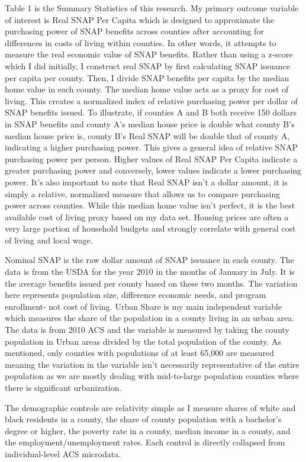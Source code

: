 \documentclass{article}
\begin{document}
Table 1 is the Summary Statistics of this research. My primary outcome variable of interest is Real SNAP Per Capita which is designed to approximate the purchasing power of SNAP benefits across counties after accounting for differences in costs of living within counties. In other words, it attempts to measure the real economic value of SNAP benefits. Rather than using a z-score which I did initially, I construct real SNAP by first calculating SNAP issuance per capita per county. Then, I divide SNAP benefits per capita by the median home value in each county. The median home value acts as a proxy for cost of living. This creates a normalized index of relative purchasing power per dollar of SNAP benefits issued. To illustrate, if counties A and B both receive 150 dollars in SNAP benefits and county A's median house price is double what county B's median house price is, county B's Real SNAP will be double that of county A, indicating a higher purchasing power. This gives a general idea of relative SNAP purchasing power per person. Higher values of Real SNAP Per Capita indicate a greater purchasing power and conversely, lower values indicate a lower purchasing power. It's also important to note that Real SNAP isn't a dollar amount, it is simply a relative, normalized measure that allows us to compare purchasing power across counties. While this median home value isn't perfect, it is the best available cost of living proxy based on my data set. Housing prices are often a very large portion of household budgets and strongly correlate with general cost of living and local wage. 

Nominal SNAP is the raw dollar amount of SNAP issuance in each county. The data is from the USDA for the year 2010 in the months of January in July. It is the average benefits issued per county based on these two months. The variation here represents population size, difference economic needs, and program enrollment- not cost of living. Urban Share is my main independent variable which measures the share of the population in a county living in an urban area. The data is from 2010 ACS and the variable is measured by taking the county population in Urban areas divided by the total population of the county. As mentioned, only counties with populations of at least 65,000 are measured meaning the variation in the variable isn't necessarily representative of the entire population as we are mostly dealing with mid-to-large population counties where there is significant urbanization. 

The demographic controls are relativity simple as I measure shares of white and black residents in a county, the share of county population with a bachelor's degree or higher, the poverty rate in a county, median income in a county, and the employment/unemployment rates. Each control is directly collapsed from individual-level ACS microdata. 
\end{document}
